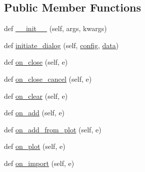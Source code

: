 \subsection*{Public Member Functions}
\begin{DoxyCompactItemize}
\item 
def \hyperlink{class_uni_dec_1_1unidec__modules_1_1_manual_selection_window_1_1_manual_selection_adbdc6390a44674c4d7d2931019ccb234}{\+\_\+\+\_\+init\+\_\+\+\_\+} (self, args, kwargs)
\item 
def \hyperlink{class_uni_dec_1_1unidec__modules_1_1_manual_selection_window_1_1_manual_selection_afa02dfc1280aaa02726090091052b1d8}{initiate\+\_\+dialog} (self, \hyperlink{class_uni_dec_1_1unidec__modules_1_1_manual_selection_window_1_1_manual_selection_a91fc22ea40c5fdbfd9513c7e9b09309f}{config}, \hyperlink{class_uni_dec_1_1unidec__modules_1_1_manual_selection_window_1_1_manual_selection_a17b6e3c84eca21572460b880f5d7fb39}{data})
\item 
def \hyperlink{class_uni_dec_1_1unidec__modules_1_1_manual_selection_window_1_1_manual_selection_ac8094048863876532ca8360f4cbd8ae3}{on\+\_\+close} (self, e)
\item 
def \hyperlink{class_uni_dec_1_1unidec__modules_1_1_manual_selection_window_1_1_manual_selection_a6f2f44b5183f210753d96eb291f17830}{on\+\_\+close\+\_\+cancel} (self, e)
\item 
def \hyperlink{class_uni_dec_1_1unidec__modules_1_1_manual_selection_window_1_1_manual_selection_afd8fef7863b8106463864ed3ad522409}{on\+\_\+clear} (self, e)
\item 
def \hyperlink{class_uni_dec_1_1unidec__modules_1_1_manual_selection_window_1_1_manual_selection_a6a9e4fb3b00d90d07853027eb3208e19}{on\+\_\+add} (self, e)
\item 
def \hyperlink{class_uni_dec_1_1unidec__modules_1_1_manual_selection_window_1_1_manual_selection_a0324623adc11b2432de82d22efc29779}{on\+\_\+add\+\_\+from\+\_\+plot} (self, e)
\item 
def \hyperlink{class_uni_dec_1_1unidec__modules_1_1_manual_selection_window_1_1_manual_selection_a995272c81357845ca2fb21a702d7c185}{on\+\_\+plot} (self, e)
\item 
def \hyperlink{class_uni_dec_1_1unidec__modules_1_1_manual_selection_window_1_1_manual_selection_a93198ea3f3445e6caefd2ac9d2624272}{on\+\_\+import} (self, e)
\end{DoxyCompactItemize}
